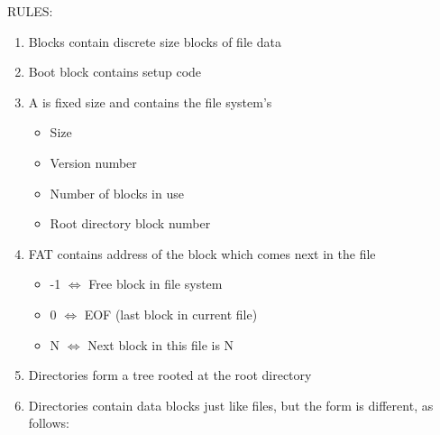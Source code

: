 \documentclass[../../lecture_notes.tex]{subfiles}
\begin{document}
RULES:
	\begin{enumerate}[nosep]
		\item Blocks contain discrete size blocks of file data
		\item Boot block contains setup code
		\item A  is fixed size and contains the file system's
			\begin{itemize}
				\item Size
				\item Version number
				\item Number of blocks in use
				\item Root directory block number
			\end{itemize}
		\item FAT contains address of the block which comes next in the file
			\begin{itemize}
				\item -1 $\iff$ Free block in file system
				\item 0 $\iff$ EOF (last block in current file)
				\item N $\iff$ Next block in this file is N
			\end{itemize}
		\item Directories form a tree rooted at the root directory
		\item Directories contain data blocks just like files, but the form is different, as follows:
	\end{enumerate}
\end{document}
